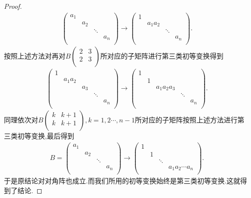 \documentclass[../../main.tex]{subfiles}%
\begin{document}
\begin{proof}
\begin{align*}
\left( \begin{matrix}
a_1&		&		&		\\
&		a_2&		&		\\
&		&		\ddots&		\\
&		&		&		a_n\\
\end{matrix} \right) \longrightarrow \left( \begin{matrix}
1&		&		&		\\
&		a_1a_2&		&		\\
&		&		\ddots&		\\
&		&		&		a_n\\
\end{matrix} \right) .
\end{align*}
按照上述方法对再对$B\left( \begin{matrix}
2&		3\\
2&		3\\
\end{matrix} \right) $所对应的子矩阵进行第三类初等变换得到
\begin{align*}
\left( \begin{matrix}
1&		&		&		&		\\
&		a_1a_2&		&		&		\\
&		&		a_3&		&		\\
&		&		&		\ddots&		\\
&		&		&		&		a_n\\
\end{matrix} \right) \longrightarrow \left( \begin{matrix}
1&		&		&		&		\\
&		1&		&		&		\\
&		&		a_1a_2a_3&		&		\\
&		&		&		\ddots&		\\
&		&		&		&		a_n\\
\end{matrix} \right) .
\end{align*}
同理依次对$B\left( \begin{matrix}
k&		k+1\\
k&		k+1\\
\end{matrix} \right),k=1,2\cdots,n-1$所对应的子矩阵按照上述方法进行第三类初等变换,最后得到
\begin{align*}
B=\left( \begin{matrix}
a_1&		&		&		\\
&		a_2&		&		\\
&		&		\ddots&		\\
&		&		&		a_n\\
\end{matrix} \right) \longrightarrow \left( \begin{matrix}
1&		&		&		\\
&		1&		&		\\
&		&		\ddots&		\\
&		&		&		a_1a_2\cdots a_n\\
\end{matrix} \right) .
\end{align*}
于是原结论对对角阵也成立.而我们所用的初等变换始终是第三类初等变换.这就得到了结论.


\end{proof}
\end{document}
